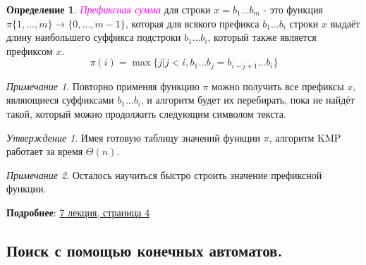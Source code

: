 \documentclass[a4paper]{article}
\theoremstyle{indented}
\theoremstyle{definition}
\newtheorem{defn}{Определение}
\theoremstyle{remark}
\newtheorem{remark}{Примечание}
\newtheorem{stat}{Утверждение}
\begin{document}
\begin{defn}
    \textcolor{magenta}{\hypertarget{d19}{\textit{Префиксная сумма}}} для строки $x=b_1\ldots b_m$ - это функция $\pi\{1, \ldots, m\}\rightarrow \{0, \ldots, m-1\}$, которая для всякого префикса $b_1\ldots b_i$ строки $x$ выдаёт длину наибольшего суффикса подстроки $b_1\ldots b_i$, который также является префиксом $x$. 
    \[
        \pi(i)=\max\{j|j<i, b_1\ldots b_j = b_{i-j+1}\ldots b_i\} 
    \]
\end{defn}

\begin{remark}
    Повторно применяя функцию $\pi$ можно получить все префиксы $x$, являющиеся суффиксами $b_1\ldots b_i$, и алгоритм будет их перебирать, пока не найдёт такой, который можно продолжить следующим символом текста. 
\end{remark}

\begin{stat}
    Имея готовую таблицу значений функции $\pi$, алгоритм KMP работает за время $\Theta(n)$. 
\end{stat}

\begin{remark}
    Осталось научиться быстро строить значение префиксной функции.
\end{remark}

\textbf{Подробнее}: \href{https://users.math-cs.spbu.ru/~okhotin/teaching/algorithms_2020/okhotin_algorithms_2020_l7.pdf}{7 лекция, страница 4}

\subsection{Поиск с помощью конечных автоматов.}
\end{document}
